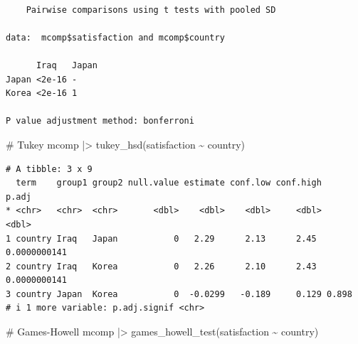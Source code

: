 \documentclass[
  letterpaper,
  DIV=11,
  numbers=noendperiod]{scrreprt}
\newenvironment{Shaded}{\begin{snugshade}}{\end{snugshade}}
\newcommand{\AlertTok}[1]{\textcolor[rgb]{0.68,0.00,0.00}{#1}}
\newcommand{\AttributeTok}[1]{\textcolor[rgb]{0.40,0.45,0.13}{#1}}
\newcommand{\CommentTok}[1]{\textcolor[rgb]{0.37,0.37,0.37}{#1}}
\newcommand{\FunctionTok}[1]{\textcolor[rgb]{0.28,0.35,0.67}{#1}}
\newcommand{\NormalTok}[1]{\textcolor[rgb]{0.00,0.23,0.31}{#1}}
\newcommand{\SpecialCharTok}[1]{\textcolor[rgb]{0.37,0.37,0.37}{#1}}
\newcommand{\StringTok}[1]{\textcolor[rgb]{0.13,0.47,0.30}{#1}}
\begin{document}
\begin{Shaded}
\end{Shaded}

\begin{verbatim}

    Pairwise comparisons using t tests with pooled SD 

data:  mcomp$satisfaction and mcomp$country 

      Iraq   Japan
Japan <2e-16 -    
Korea <2e-16 1    

P value adjustment method: bonferroni 
\end{verbatim}

\begin{Shaded}
\begin{Highlighting}[]
\CommentTok{\# Tukey}
\NormalTok{mcomp }\SpecialCharTok{|\textgreater{}} \FunctionTok{tukey\_hsd}\NormalTok{(satisfaction }\SpecialCharTok{\textasciitilde{}}\NormalTok{ country)}
\end{Highlighting}
\end{Shaded}

\begin{verbatim}
# A tibble: 3 x 9
  term    group1 group2 null.value estimate conf.low conf.high        p.adj
* <chr>   <chr>  <chr>       <dbl>    <dbl>    <dbl>     <dbl>        <dbl>
1 country Iraq   Japan           0   2.29      2.13      2.45  0.0000000141
2 country Iraq   Korea           0   2.26      2.10      2.43  0.0000000141
3 country Japan  Korea           0  -0.0299   -0.189     0.129 0.898       
# i 1 more variable: p.adj.signif <chr>
\end{verbatim}

\begin{Shaded}
\begin{Highlighting}[]
\CommentTok{\# Games{-}Howell}
\NormalTok{mcomp }\SpecialCharTok{|\textgreater{}} \FunctionTok{games\_howell\_test}\NormalTok{(satisfaction }\SpecialCharTok{\textasciitilde{}}\NormalTok{ country)}
\end{Highlighting}
\end{Shaded}
\end{document}
